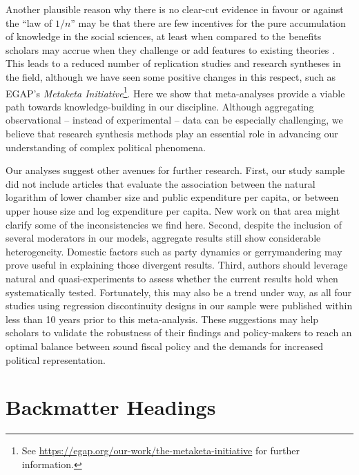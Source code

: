 \documentclass[11pt,a4paper,]{article}
\begin{document}
Another plausible reason why there is no clear-cut evidence in favour or
against the ``law of \(1/n\)'' may be that there are few incentives for
the pure accumulation of knowledge in the social sciences, at least when
compared to the benefits scholars may accrue when they challenge or add
features to existing theories \citep{geddes2003paradigms}. This leads to
a reduced number of replication studies and research syntheses in the
field, although we have seen some positive changes in this respect, such
as EGAP's \emph{Metaketa Initiative}\footnote{See
\url{https://egap.org/our-work/the-metaketa-initiative} for further
information.}. Here we show that meta-analyses provide a viable path
towards knowledge-building in our discipline. Although aggregating
observational -- instead of experimental -- data can be especially
challenging, we believe that research synthesis methods play an
essential role in advancing our understanding of complex political
phenomena.

Our analyses suggest other avenues for further research. First, our
study sample did not include articles that evaluate the association
between the natural logarithm of lower chamber size and public
expenditure per capita, or between upper house size and log expenditure
per capita. New work on that area might clarify some of the
inconsistencies we find here. Second, despite the inclusion of several
moderators in our models, aggregate results still show considerable
heterogeneity. Domestic factors such as party dynamics or gerrymandering
\citep{lee2015supermajority, mukherjee2003politicalparties, gilligan2006public}
may prove useful in explaining those divergent results. Third, authors
should leverage natural and quasi-experiments to assess whether the
current results hold when systematically tested. Fortunately, this may
also be a trend under way, as all four studies using regression
discontinuity designs in our sample were published within less than 10
years prior to this meta-analysis. These suggestions may help scholars
to validate the robustness of their findings and policy-makers to reach
an optimal balance between sound fiscal policy and the demands for
increased political representation.

\hypertarget{backmatter-headings}{%
\section{Backmatter Headings}\label{backmatter-headings}}
\end{document}
